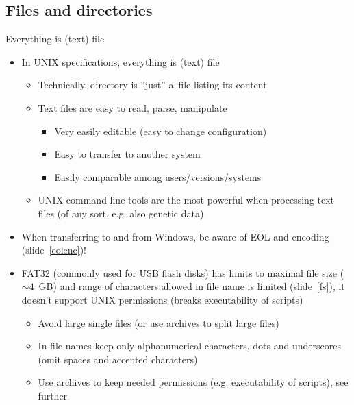 \documentclass[compress, ucs, xelatex, 11pt, xcolor=svgnames, aspectratio=169,
	hyperref={
		bookmarks=true,
		unicode=true,
		colorlinks=true,
		pdftitle={Linux, command line and MetaCentrum},
		plainpages=false,
		pdfauthor={Vojtech Zeisek},
		pdfsubject={Course about use of Linux command line, writing shell scripts and using MetaCentrum of CESNET},
		pdfcreator={XeLaTeX},
		pdfkeywords={Linux, GNU, BASH, shell, command line, MetaCentrum},
		linkcolor=DarkRed, %
		anchorcolor=DarkBlue, %
		citecolor=Indigo, %
		filecolor=NavyBlue, %
		menucolor=DarkMagenta, %
		urlcolor=DarkBlue, %
		pdftex},
	url={hyphens, lowtilde} %
	]{beamer}
\begin{document}
\subsection{Files and directories}

\begin{frame}{Everything is (text) file}
	\begin{itemize}
		\item In UNIX specifications, everything is (text) file
		\begin{itemize}
			\item Technically, directory is \enquote{just} a~file listing its content
			\item Text files are easy to read, parse, manipulate
			\begin{itemize}
				\item Very easily editable (easy to change configuration)
				\item Easy to transfer to another system
				\item Easily comparable among users/versions/systems
			\end{itemize}
			\item UNIX command line tools are the most powerful when processing text files (of any sort, e.g. also genetic data)
		\end{itemize}
		\item When transferring to and from Windows, be aware of EOL and encoding (slide~\ref{eolenc})!
		\item FAT32 (commonly used for USB flash disks) has limits to maximal file size ($\sim4$~GB) and range of characters allowed in file name is limited (slide~\ref{fs}), it doesn't support UNIX permissions (breaks executability of scripts)
		\begin{itemize}
			\item Avoid large single files (or use archives to split large files)
			\item In file names keep only alphanumerical characters, dots and underscores (omit spaces and accented characters)
			\item Use archives to keep needed permissions (e.g. executability of scripts), see further
		\end{itemize}
		\end{itemize}
\end{frame}
\end{document}
